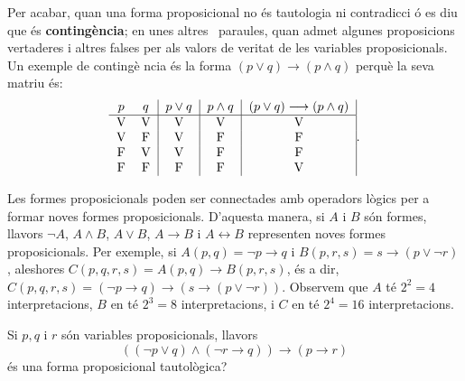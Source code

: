 Per acabar, quan una forma proposicional no \'{e}s tautologia ni contradicci%
\'{o} es diu que \'{e}s \textbf{conting\`{e}ncia}; en unes altres \
paraules, quan admet algunes proposicions vertaderes i altres falses per als
valors de veritat de les variables proposicionals. Un exemple de conting\`{e}%
ncia \'{e}s la forma $(p\vee q)\longrightarrow(p\wedge q)$ perqu\`{e} la
seva matriu \'{e}s:%
\begin{equation*}
\begin{tabular}{cc|c|c|c|}
$p$ & $q$ & $p\vee q$ & $p\wedge q$ & $(p\vee q)\longrightarrow(p\wedge q)$
\\ \hline
V & V & V & V & V \\
V & F & V & F & F \\
F & V & V & F & F \\
F & F & F & F & V%
\end{tabular}
\text{.}
\end{equation*}

\bigskip

Les formes proposicionals poden ser connectades amb operadors l\`{o}gics per
a formar noves formes proposicionals. D'aquesta manera, si $A$ i $B$ s\'{o}n
formes, llavors $\lnot A$, $A\wedge B$, $A\vee B$, $A\longrightarrow B$ i $%
A\longleftrightarrow B$ representen noves formes proposicionals. Per
exemple, si $A(p,q)=\lnot p\longrightarrow q$ i $B(p,r,s)=s\longrightarrow%
\left( p\vee\lnot r\right) $, aleshores $C(p,q,r,s)=A(p,q)\longrightarrow
B(p,r,s)$, \'{e}s a dir, $C(p,q,r,s)=\left( \lnot p\longrightarrow q\right)
\longrightarrow\left( s\longrightarrow\left( p\vee\lnot r\right) \right) $.
Observem que $A$ t\'{e} $2^{2}=4$ interpretacions, $B$ en t\'{e} $2^{3}=8$
interpretacions, i $C$ en t\'{e} $2^{4}=16$ interpretacions.

\begin{exemple}
Si $p,q$ i $r$ s\'{o}n variables proposicionals, llavors
\[
\left( \left(\lnot p\vee q\right) \wedge\left( \lnot r\longrightarrow q\right) \right)
\longrightarrow\left( p\longrightarrow r\right)
\]
\'{e}s una forma proposicional tautol\`{o}gica?
\end{exemple}


